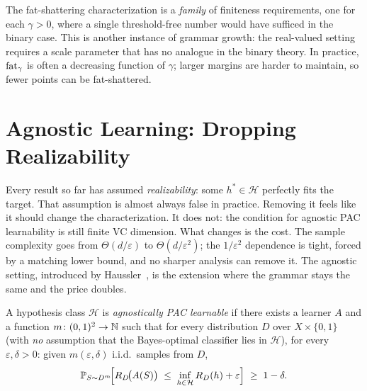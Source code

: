 \begin{remark}
\label{rmk:scale-family}
The fat-shattering characterization is a \emph{family} of finiteness
requirements, one for each $\gamma > 0$, where a single threshold-free number
would have sufficed in the binary case.  This is
another instance of grammar growth: the real-valued setting requires a
scale parameter that has no analogue in the binary theory.  In practice,
$\mathrm{fat}_\gamma$ is often a decreasing function of $\gamma$; larger
margins are harder to maintain, so fewer points can be fat-shattered.
\end{remark}



\section{Agnostic Learning: Dropping Realizability}
\label{sec:agnostic-ext}

Every result so far has assumed \emph{realizability}: some $h^* \in
\mathcal{H}$ perfectly fits the target.  That assumption is almost always
false in practice.  Removing it feels like it should change the characterization.
It does not: the condition for agnostic PAC learnability is still finite VC
dimension.  What changes is the cost.  The sample complexity goes from
$\Theta(d/\varepsilon)$ to $\Theta(d/\varepsilon^2)$; the $1/\varepsilon^2$ dependence
is tight, forced by a matching lower bound, and no sharper analysis can remove
it.  The agnostic setting, introduced by Haussler~\cite{Haussler1992}, is the
extension where the grammar stays the same and the price doubles.

\begin{defn}
\label{def:agnostic-pac-ext}
A hypothesis class $\mathcal{H}$ is \emph{agnostically PAC learnable}
if there exists a learner $A$ and a function $m \colon (0,1)^2 \to \mathbb{N}$ such
that for every distribution $D$ over $X \times \{0,1\}$ (with \emph{no}
assumption that the Bayes-optimal classifier lies in $\mathcal{H}$), for
every $\varepsilon, \delta > 0$: given $m(\varepsilon, \delta)$ i.i.d.\
samples from $D$,
\[
  \mathbb{P}_{S \sim D^m}\!\Bigl[
    R_D\!\bigl(A(S)\bigr)
    \;\leq\;
    \inf_{h \in \mathcal{H}} R_D(h) + \varepsilon
  \Bigr] \;\geq\; 1 - \delta.
\]
\end{defn}

